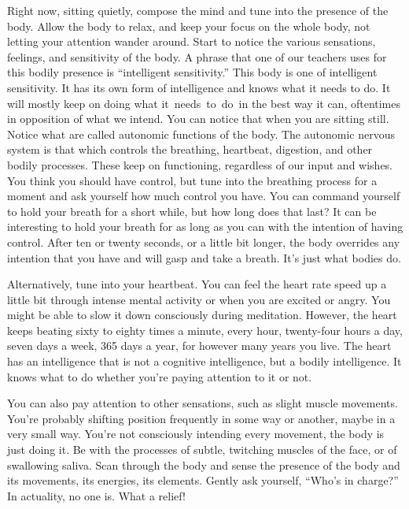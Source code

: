 Right now, sitting quietly, compose the mind and tune into the presence of the body. Allow the body to relax, and keep your focus on the whole body, not letting your attention wander around. Start to notice the various sensations, feelings, and sensitivity of the body. A phrase that one of our teachers uses for this bodily presence is ``intelligent sensitivity.'' This body is one of intelligent sensitivity. It has its own form of intelligence and knows what it needs to do. It will mostly keep on doing what \mbox{it needs to do in} the best way it can, oftentimes in opposition of what we intend. You can notice that when you are sitting still. Notice what are called autonomic functions of the body. The autonomic nervous system is that which controls the breathing, heartbeat, digestion, and other bodily processes. These keep on functioning, regardless of our input and wishes. You think you should have control, but tune into the breathing process for a moment and ask yourself how much control you have. You can command yourself to hold your breath for a short while, but how long does that last? It can be interesting to hold your breath for as long as you can with the intention of having control. After ten or twenty seconds, or a little bit longer, the body overrides any intention that you have and will gasp and take a breath. It's just what bodies do.

Alternatively, tune into your heartbeat. You can feel the heart rate speed up a little bit through intense mental activity or when you are excited or angry. You might be able to slow it down consciously during meditation. However, the heart keeps beating sixty to eighty times a minute, every hour, twenty-four hours a day, seven days a week, 365 days a year, for however many years you live. The heart has an intelligence that is not a cognitive intelligence, but a bodily intelligence. It knows what to do whether you're paying attention to it or not.

You can also pay attention to other sensations, such as slight muscle movements. You're probably shifting position frequently in some way or another, maybe in a very small way. You're not consciously intending every movement, the body is just doing it. Be with the processes of subtle, twitching muscles of the face, or of swallowing saliva. Scan through the body and sense the presence of the body and its movements, its energies, its elements. Gently ask yourself, ``Who's in charge?'' In actuality, no one is. What a relief!

